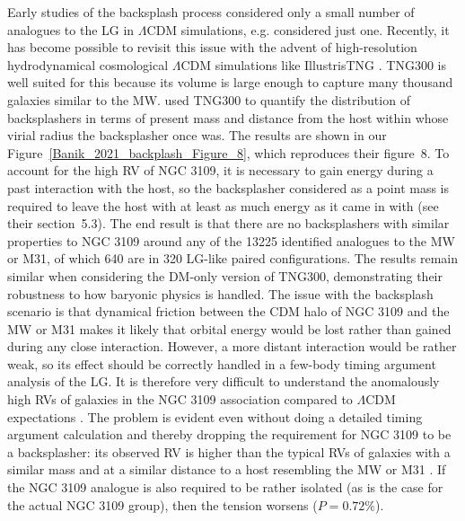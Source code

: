 \documentclass[fleqn,usenatbib,useAMS]{mnras} %
\begin{document}
Early studies of the backsplash process considered only a small number of analogues to the LG in $\Lambda$CDM simulations, e.g. \citet{Teyssier_2012} considered just one. Recently, it has become possible to revisit this issue with the advent of high-resolution hydrodynamical cosmological $\Lambda$CDM simulations like IllustrisTNG \citep{Nelson_2019}. TNG300 is well suited for this because its volume is large enough to capture many thousand galaxies similar to the MW. \citet{Banik_2021_backsplash} used TNG300 to quantify the distribution of backsplashers in terms of present mass and distance from the host within whose virial radius the backsplasher once was. The results are shown in our Figure~\ref{Banik_2021_backplash_Figure_8}, which reproduces their figure~8. To account for the high RV of NGC 3109, it is necessary to gain energy during a past interaction with the host, so the backsplasher considered as a point mass is required to leave the host with at least as much energy as it came in with (see their section~5.3). The end result is that there are no backsplashers with similar properties to NGC 3109 around any of the 13225 identified analogues to the MW or M31, of which 640 are in 320 LG-like paired configurations. The results remain similar when considering the DM-only version of TNG300, demonstrating their robustness to how baryonic physics is handled. The issue with the backsplash scenario is that dynamical friction between the CDM halo of NGC 3109 and the MW or M31 makes it likely that orbital energy would be lost rather than gained during any close interaction. However, a more distant interaction would be rather weak, so its effect should be correctly handled in a few-body timing argument analysis of the LG. It is therefore very difficult to understand the anomalously high RVs of galaxies in the NGC 3109 association compared to $\Lambda$CDM expectations \citep{Peebles_2017, Banik_Zhao_2017, Banik_2018_anisotropy}. The problem is evident even without doing a detailed timing argument calculation and thereby dropping the requirement for NGC 3109 to be a backsplasher: its observed RV is higher than the typical RVs of galaxies with a similar mass and at a similar distance to a host resembling the MW or M31 \citep[$P = 1.09\%$; see section~4.1 of][]{Banik_2021_backsplash}. If the NGC 3109 analogue is also required to be rather isolated (as is the case for the actual NGC 3109 group), then the tension worsens ($P = 0.72\%$).

\end{document}
